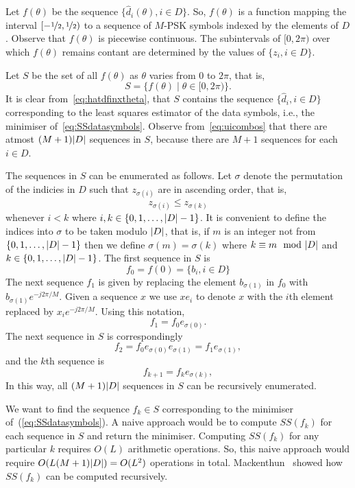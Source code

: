 \documentclass[a4paper,10pt]{article}
\begin{document}
Let $f(\theta)$ be the sequence $\{ \hat{d}_i(\theta), i \in D \}$. So, $f(\theta)$ is a function mapping the interval $[-\nicefrac{1}{2}, \nicefrac{1}{2})$ to a sequence of $M$-PSK symbols indexed by the elements of $D$.  Observe that $f(\theta)$ is piecewise continuous.  The subintervals of $[0, 2\pi)$ over which $f(\theta)$ remains contant are determined by the values of $\{z_i, i \in D\}$.

Let $S$ be the set of all $f(\theta)$ as $\theta$ varies from $0$ to $2\pi$, that is,
\[
S = \{ f(\theta) \mid \theta \in [0, 2 \pi) \}.
\]
It is clear from~\eqref{eq:hatdfinxtheta}, that $S$ contains the sequence $\{ \hat{d}_i, i \in D \}$ corresponding to the least squares estimator of the data symbols, i.e., the minimiser of~\eqref{eq:SSdatasymbols}.  Observe from~\eqref{eq:uicombos} that there are atmost $(M+1){\left| D \right|}$ sequences in $S$, because there are $M+1$ sequences for each $i \in D$.

The sequences in $S$ can be enumerated as follows.  Let $\sigma$ denote the permutation of the indicies in $D$ such that $z_{\sigma(i)}$ are in ascending order, that is,
\begin{equation}\label{eq:sigmasortind}
z_{\sigma(i)} \leq z_{\sigma(k)}
\end{equation}
whenever $i < k $ where $i, k \in \{0, 1, \dots, {\left| D \right|}-1\}$.  It is convenient to define the indices into $\sigma$ to be taken modulo ${\left| D \right|}$, that is, if $m$ is an integer not from $\{0, 1, \dots, {\left| D \right|}-1\}$ then we define $\sigma(m) = \sigma(k)$ where $k \equiv m \mod \abs{D}$ and $k \in  \{0, 1, \dots, {\left| D \right|}-1\}$.  The first sequence in $S$ is 
\[
f_0 = f(0) = \{ b_i, i \in D \}
\]  
The next sequence $f_1$ is given by replacing the element $b_{\sigma(1)}$ in $f_0$ with $b_{\sigma(1)}e^{-j2\pi/M}$.  Given a sequence $x$ we use $x e_i$ to denote $x$ with the $i$th element replaced by $x_i e^{-j2\pi/M}$.  Using this notation,  
\[
f_1 = f_0 e_{\sigma(0)}.
\] 
The next sequence in $S$ is correspondingly 
\[
f_2 = f_0 e_{\sigma(0)} e_{\sigma(1)} = f_1 e_{\sigma(1)},
\]
and the $k$th sequence is
\begin{equation}\label{eq:fkrec}
f_{k+1} = f_{k} e_{\sigma(k)},
\end{equation}
In this way, all $(M+1){\left| D \right|}$ sequences in $S$ can be recursively enumerated.

We want to find the sequence $f_k \in S$ corresponding to the minimiser of~(\ref{eq:SSdatasymbols}).  A naive approach would be to compute $SS(f_k)$ for each sequence in $S$ and return the minimiser.  Computing $SS(f_k)$ for any particular $k$ requires $O(L)$ arithmetic operations.  So, this naive approach would require $O(L (M+1) {\left| D \right|}) = O(L^2)$ operations in total.  Mackenthun~\cite{Mackenthun1994} showed how $SS(f_k)$ can be computed recursively.
\end{document}
